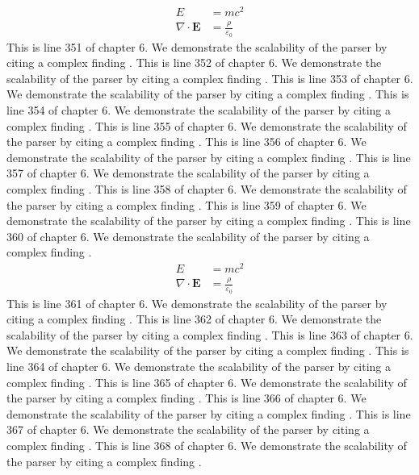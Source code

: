 \begin{align*}
  E &= mc^2 \\
  \nabla \cdot \mathbf{E} &= \frac{\rho}{\varepsilon_0}
\end{align*}
This is line 351 of chapter 6. We demonstrate the scalability of the parser by citing a complex finding \cite{ref6_351}.
This is line 352 of chapter 6. We demonstrate the scalability of the parser by citing a complex finding \cite{ref6_352}.
This is line 353 of chapter 6. We demonstrate the scalability of the parser by citing a complex finding \cite{ref6_353}.
This is line 354 of chapter 6. We demonstrate the scalability of the parser by citing a complex finding \cite{ref6_354}.
This is line 355 of chapter 6. We demonstrate the scalability of the parser by citing a complex finding \cite{ref6_355}.
This is line 356 of chapter 6. We demonstrate the scalability of the parser by citing a complex finding \cite{ref6_356}.
This is line 357 of chapter 6. We demonstrate the scalability of the parser by citing a complex finding \cite{ref6_357}.
This is line 358 of chapter 6. We demonstrate the scalability of the parser by citing a complex finding \cite{ref6_358}.
This is line 359 of chapter 6. We demonstrate the scalability of the parser by citing a complex finding \cite{ref6_359}.
This is line 360 of chapter 6. We demonstrate the scalability of the parser by citing a complex finding \cite{ref6_360}.
\begin{align*}
  E &= mc^2 \\
  \nabla \cdot \mathbf{E} &= \frac{\rho}{\varepsilon_0}
\end{align*}
This is line 361 of chapter 6. We demonstrate the scalability of the parser by citing a complex finding \cite{ref6_361}.
This is line 362 of chapter 6. We demonstrate the scalability of the parser by citing a complex finding \cite{ref6_362}.
This is line 363 of chapter 6. We demonstrate the scalability of the parser by citing a complex finding \cite{ref6_363}.
This is line 364 of chapter 6. We demonstrate the scalability of the parser by citing a complex finding \cite{ref6_364}.
This is line 365 of chapter 6. We demonstrate the scalability of the parser by citing a complex finding \cite{ref6_365}.
This is line 366 of chapter 6. We demonstrate the scalability of the parser by citing a complex finding \cite{ref6_366}.
This is line 367 of chapter 6. We demonstrate the scalability of the parser by citing a complex finding \cite{ref6_367}.
This is line 368 of chapter 6. We demonstrate the scalability of the parser by citing a complex finding \cite{ref6_368}.

